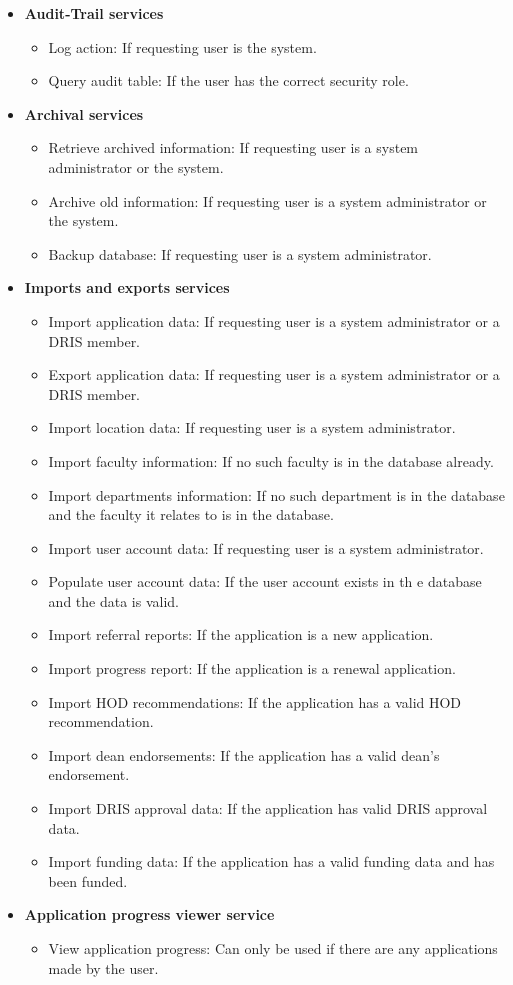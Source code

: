 \documentclass[12pt]{article}
\begin{document}
\begin{itemize}
	\item \textbf{Audit-Trail services}
		\begin{itemize}
			\item Log action: If requesting user is the system.
			\item Query audit table: If the user has the correct security role.										
		\end{itemize}
	\item \textbf{Archival services}
		\begin{itemize}
			\item Retrieve archived information: If requesting user is a system administrator or the system.
			\item Archive old information: If requesting user is a system administrator or the system.	
			\item Backup database: If requesting user is a system administrator.					
		\end{itemize}
	\item \textbf{Imports and exports services}
		\begin{itemize}
			\item Import application data: If requesting user is a system administrator or a DRIS member.
			\item Export application data: If requesting user is a system administrator or a DRIS member.	
			\item Import location data: If requesting user is a system administrator.
			\item Import faculty information: If no such faculty is in the database already.
			\item Import departments information: If no such department is in the database and the faculty it relates to is in the database.
			\item Import user account data: If requesting user is a system administrator.
			\item Populate user account data: If the user account exists in th e database and the data is valid.
			\item Import referral reports: If the application is a new application.
			\item Import progress report: If the application is a renewal application.
			\item Import HOD recommendations: If the application has a valid HOD recommendation.
			\item Import dean endorsements: If the application has a valid dean's endorsement.
			\item Import DRIS approval data: If the application has valid DRIS approval data.
			\item Import funding data: If the application has a valid funding data and has been funded.				
		\end{itemize}		
	\item \textbf{Application progress viewer service}
		\begin{itemize}
			\item View application progress: Can only be used if there are any applications made by the user.
		\end{itemize}
		

\end{itemize}
\end{document}
